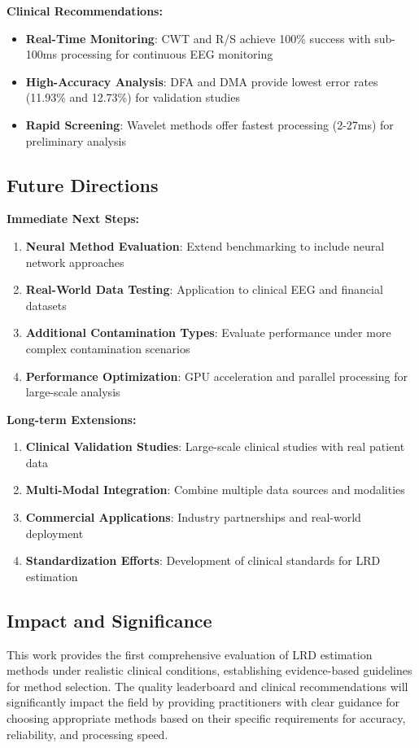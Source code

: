 \textbf{Clinical Recommendations:}
\begin{itemize}
    \item \textbf{Real-Time Monitoring}: CWT and R/S achieve 100\% success with sub-100ms processing for continuous EEG monitoring
    \item \textbf{High-Accuracy Analysis}: DFA and DMA provide lowest error rates (11.93\% and 12.73\%) for validation studies
    \item \textbf{Rapid Screening}: Wavelet methods offer fastest processing (2-27ms) for preliminary analysis
\end{itemize}

\subsection{Future Directions}

\textbf{Immediate Next Steps:}
\begin{enumerate}
    \item \textbf{Neural Method Evaluation}: Extend benchmarking to include neural network approaches
    \item \textbf{Real-World Data Testing}: Application to clinical EEG and financial datasets
    \item \textbf{Additional Contamination Types}: Evaluate performance under more complex contamination scenarios
    \item \textbf{Performance Optimization}: GPU acceleration and parallel processing for large-scale analysis
\end{enumerate}

\textbf{Long-term Extensions:}
\begin{enumerate}
    \item \textbf{Clinical Validation Studies}: Large-scale clinical studies with real patient data
    \item \textbf{Multi-Modal Integration}: Combine multiple data sources and modalities
    \item \textbf{Commercial Applications}: Industry partnerships and real-world deployment
    \item \textbf{Standardization Efforts}: Development of clinical standards for LRD estimation
\end{enumerate}

\subsection{Impact and Significance}

This work provides the first comprehensive evaluation of LRD estimation methods under realistic clinical conditions, establishing evidence-based guidelines for method selection. The quality leaderboard and clinical recommendations will significantly impact the field by providing practitioners with clear guidance for choosing appropriate methods based on their specific requirements for accuracy, reliability, and processing speed.
